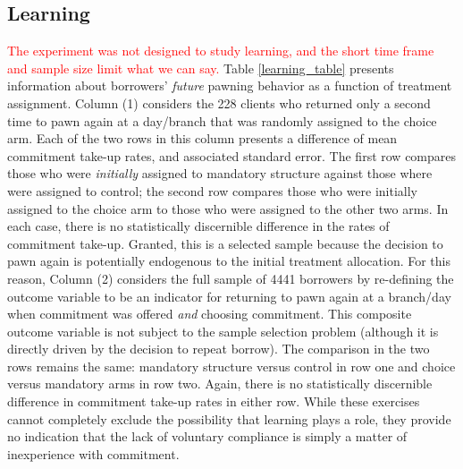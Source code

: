 \begin{appendix}
\subsection{Learning}

\textcolor{red}{The experiment was not designed to study learning, and the short time frame and sample size limit what we can say.} Table \ref{learning_table} presents information about borrowers' \emph{future} pawning behavior as a function of treatment assignment. Column (1) considers the 228 clients who returned only a second time to pawn again at a day/branch that was randomly assigned to the choice arm. Each of the two rows in this column presents a difference of mean commitment take-up rates, and associated standard error. The first row compares those who were \emph{initially} assigned to mandatory structure against those where were assigned to control; the second row compares those who were initially assigned to the choice arm to those who were assigned to the other two arms. In each case, there is no statistically discernible difference in the rates of commitment take-up. Granted, this is a selected sample because the decision to pawn again is potentially endogenous to the initial treatment allocation. For this reason, Column (2) considers the full sample of 4441 borrowers by re-defining the outcome variable to be an indicator for returning to pawn again at a branch/day when commitment was offered \emph{and} choosing commitment. This composite outcome variable is not subject to the sample selection problem (although it is directly driven by the decision to repeat borrow). The comparison in the two rows remains the same: mandatory structure versus control in row one and choice versus mandatory arms in row two. Again, there is no statistically discernible difference in commitment take-up rates in either row. While these exercises cannot completely exclude the possibility that learning plays a role, they provide no indication that the lack of voluntary compliance is simply a matter of inexperience with commitment.




\end{appendix}
